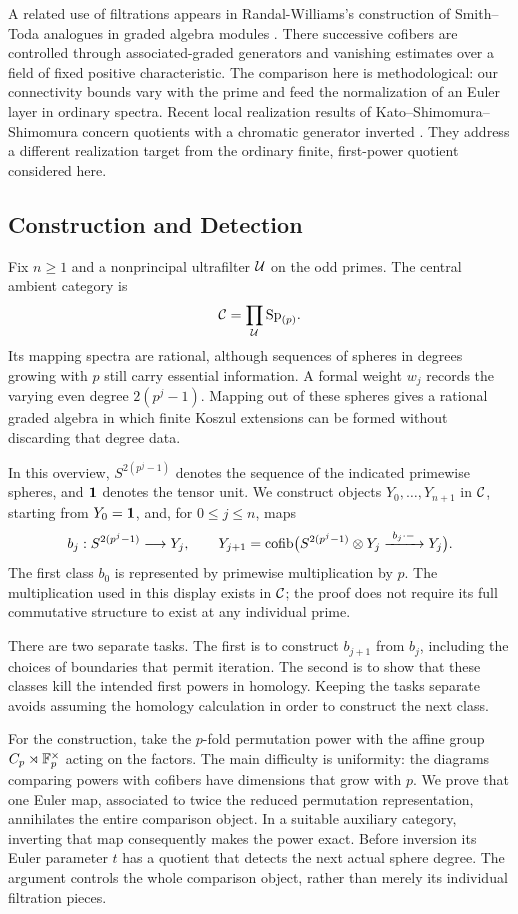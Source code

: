 A related use of filtrations appears in Randal-Williams's construction
of Smith--Toda analogues in graded algebra modules
\cite[Section~5, Theorem~5.6 and Lemma~5.7]{RandalWilliams2026}.
There successive cofibers are controlled through associated-graded
generators and vanishing estimates over a field of fixed positive
characteristic. The comparison here is methodological: our
connectivity bounds vary with the prime and feed the normalization
of an Euler layer in ordinary spectra. Recent local realization
results of Kato--Shimomura--Shimomura concern quotients with a
chromatic generator inverted \cite[Theorem~1.7]{KatoShimomura2025}.
They address a different realization target from the ordinary
finite, first-power quotient considered here.

\subsection{Construction and Detection}
Fix $n\geq1$ and a nonprincipal ultrafilter $\mathcal U$ on the odd primes.
The central ambient category is
\[
 \mathcal C=\prod_{\mathcal U}\mathrm{Sp}_{(p)}.
\]
Its mapping spectra are rational, although sequences of spheres in
degrees growing with $p$ still carry essential information. A formal
weight $w_j$ records the varying even degree $2(p^j-1)$. Mapping out
of these spheres gives a rational graded algebra in which finite
Koszul extensions can be formed without discarding that degree data.

In this overview, $S^{2(p^j-1)}$ denotes the sequence of the indicated
primewise spheres, and $\mathbf 1$ denotes the tensor unit. We construct
objects $Y_0,\ldots,Y_{n+1}$ in $\mathcal C$, starting from $Y_0=\mathbf 1$,
and, for $0\leq j\leq n$, maps
\[
 b_j:S^{2(p^j-1)}\longrightarrow Y_j,
 \qquad
 Y_{j+1}=\operatorname{cofib}\bigl(
 S^{2(p^j-1)}\otimes Y_j\xrightarrow{\ b_j\cdot-\ }Y_j
 \bigr).
\]
The first class $b_0$ is represented by primewise multiplication by
$p$. The multiplication used in this display
exists in $\mathcal C$; the proof does not require its full commutative
structure to exist at any individual prime.

There are two separate tasks. The first is to construct $b_{j+1}$
from $b_j$, including the choices of boundaries that permit iteration.
The second is to show that these classes kill the intended first
powers in homology. Keeping the tasks separate avoids assuming the
homology calculation in order to construct the next class.

For the construction, take the $p$-fold permutation power with the
affine group $C_p\rtimes\mathbb F_p^{\times}$ acting on the factors. The
main difficulty is uniformity: the diagrams comparing powers with
cofibers have dimensions that grow with $p$. We prove that one Euler
map, associated to twice the reduced permutation representation,
annihilates the entire comparison object. In a suitable auxiliary
category, inverting that map consequently makes the power exact.
Before inversion its Euler parameter $t$ has a quotient that detects
the next actual sphere degree. The argument controls the whole
comparison object, rather than merely its individual filtration pieces.

